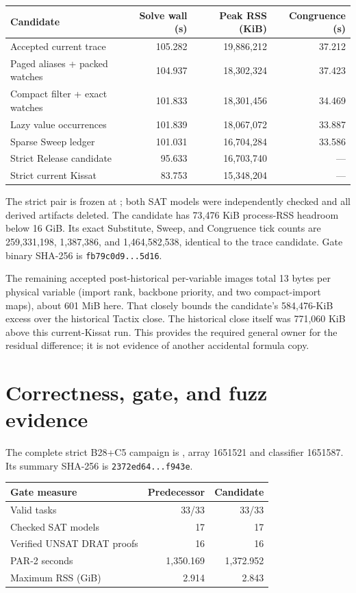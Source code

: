 \documentclass[11pt]{article}
\newcommand{\code}[1]{\texttt{#1}}
\begin{document}
\begin{center}
\begin{tabular}{@{}lrrr@{}}
\toprule
Candidate & Solve wall (s) & Peak RSS (KiB) & Congruence (s) \\
\midrule
Accepted current trace & 105.282 & 19,886,212 & 37.212 \\
Paged aliases + packed watches & 104.937 & 18,302,324 & 37.423 \\
Compact filter + exact watches & 101.833 & 18,301,456 & 34.469 \\
Lazy value occurrences & 101.839 & 18,067,072 & 33.887 \\
Sparse Sweep ledger & 101.031 & 16,704,284 & 33.586 \\
Strict Release candidate & 95.633 & 16,703,740 & --- \\
Strict current Kissat & 83.753 & 15,348,204 & --- \\
\bottomrule
\end{tabular}
\end{center}

The strict pair is frozen at
; both SAT
models were independently checked and all derived artifacts deleted.  The
candidate has 73,476 KiB process-RSS headroom below 16 GiB.  Its exact
Substitute, Sweep, and Congruence tick counts are 259,331,198, 1,387,386, and
1,464,582,538, identical to the trace candidate.  Gate binary SHA-256 is
\code{fb79c0d9...5d16}.

The remaining accepted post-historical per-variable images total 13 bytes per
physical variable (import rank, backbone priority, and two compact-import
maps), about 601 MiB here.  That closely bounds the candidate's 584,476-KiB
excess over the historical Tactix close.  The historical close itself was
771,060 KiB above this current-Kissat run.  This provides the required general
owner for the residual difference; it is not evidence of another accidental
formula copy.

\section{Correctness, gate, and fuzz evidence}

The complete strict B28+C5 campaign is
, array
1651521 and classifier 1651587.  Its summary SHA-256 is
\code{2372ed64...f943e}.

\begin{center}
\begin{tabular}{@{}lrr@{}}
\toprule
Gate measure & Predecessor & Candidate \\
\midrule
Valid tasks & 33/33 & 33/33 \\
Checked SAT models & 17 & 17 \\
Verified UNSAT DRAT proofs & 16 & 16 \\
PAR-2 seconds & 1,350.169 & 1,372.952 \\
Maximum RSS (GiB) & 2.914 & 2.843 \\
\bottomrule
\end{tabular}
\end{center}
\end{document}
